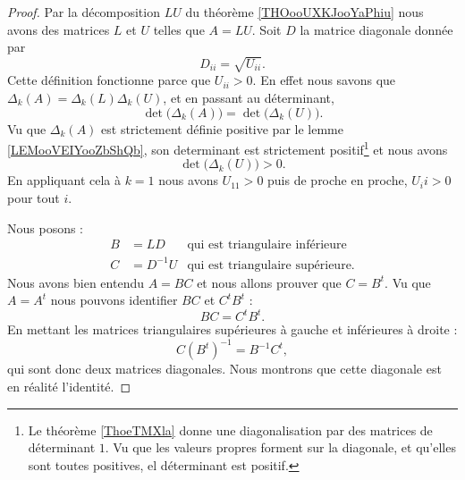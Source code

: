 \begin{proof}
    Par la décomposition \( LU\) du théorème \ref{THOooUXKJooYaPhiu} nous avons des matrices \( L\) et \( U\) telles que \( A=LU\). Soit \( D\) la matrice diagonale donnée par 
    \begin{equation}
        D_{ii}=\sqrt{ U_{ii} }.
    \end{equation}
    Cette définition fonctionne parce que \( U_{ii}>0\). En effet nous savons que \( \Delta_k(A)=\Delta_k(L)\Delta_k(U)\), et en passant au déterminant, 
    \begin{equation}
        \det\big( \Delta_k(A) \big)=\det\big( \Delta_k(U) \big).
    \end{equation}
    Vu que \( \Delta_k(A)\) est strictement définie positive par le lemme \ref{LEMooVEIYooZbShQb}, son determinant est strictement positif\footnote{Le théorème \ref{ThoeTMXla} donne une diagonalisation par des matrices de déterminant \( 1\). Vu que les valeurs propres forment sur la diagonale, et qu'elles sont toutes positives, el déterminant est positif.} et nous avons
    \begin{equation}
        \det\big( \Delta_k(U) \big)>0.
    \end{equation}
    En appliquant cela à \( k=1\) nous avons \( U_{11}>0\) puis de proche en proche, \( U_ii>0\) pour tout \( i\).

    Nous posons :
    \begin{subequations}
        \begin{align}
            B&=LD&\text{qui est triangulaire inférieure}\\
            C&=D^{-1} U&\text{qui est triangulaire supérieure.}
        \end{align}
    \end{subequations}
    Nous avons bien entendu \( A=BC\) et nous allons prouver que \( C=B^t\). Vu que \( A=A^t\) nous pouvons identifier \( BC\) et \( C^tB^t\) :
    \begin{equation}
        BC=C^tB^t.
    \end{equation}
    En mettant les matrices triangulaires supérieures à gauche et inférieures à droite :
    \begin{equation}
        C(B^t)^{-1}=B^{-1}C^t,
    \end{equation}
    qui sont donc deux matrices diagonales. Nous montrons que cette diagonale est en réalité l'identité.


\end{proof}
